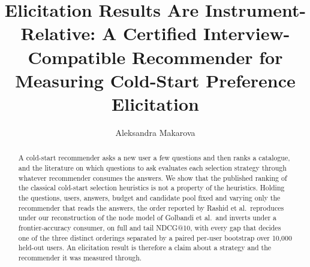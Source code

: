 \documentclass[manuscript,screen]{acmart}
\begin{document}
\title[Elicitation Results Are Instrument-Relative]{Elicitation Results Are Instrument-Relative: A Certified Interview-Compatible Recommender for Measuring Cold-Start Preference Elicitation}

\author{Aleksandra Makarova}

\renewcommand{\shortauthors}{Makarova et al.}

\begin{abstract}
A cold-start recommender asks a new user a few questions and then ranks a catalogue, and the literature on which questions to ask evaluates each selection strategy through whatever recommender consumes the answers. We show that the published ranking of the classical cold-start selection heuristics is not a property of the heuristics. Holding the questions, users, answers, budget and candidate pool fixed and varying only the recommender that reads the answers, the order reported by Rashid et al.\ reproduces under our reconstruction of the node model of Golbandi et al.\ and inverts under a frontier-accuracy consumer, on full and tail NDCG@10, with every gap that decides one of the three distinct orderings separated by a paired per-user bootstrap over 10,000 held-out users. An elicitation result is therefore a claim about a strategy and the recommender it was measured through.


\end{abstract}
\end{document}
